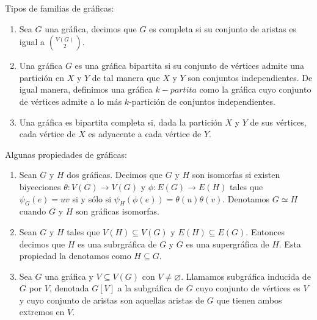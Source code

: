 \begin{definicion} Tipos de familias de gr\'aficas:
    \label{def:familias}
    \begin{enumerate}
        \item Sea $G$ una gr\'afica, decimos que $G$ es completa si su
        conjunto de aristas es igual a $\binom{V(G)}{2}$.
        \item Una gr\'afica $G$ es una gr\'afica bipartita si su conjunto de
        v\'ertices admite una partici\'on en $X$ y $Y$ de tal manera que $X$
        y $Y$ son conjuntos independientes. De igual manera, definimos una
        gr\'afica $k-\textit{partita}$ como la gr\'afica cuyo conjunto de
        v\'ertices admite a lo m\'as $k$-partici\'on de conjuntos
        independientes.
        \item Una gr\'afica es bipartita completa si, dada la partici\'on
        $X$ y $Y$ de sus v\'ertices, cada v\'ertice de $X$ es adyacente a
        cada v\'ertice de $Y$.   
    \end{enumerate}
\end{definicion}

\begin{definicion} Algunas propiedades de gr\'aficas:
    \label{def:propiedades}
    \begin{enumerate}
        \item Sean $G$ y $H$ dos gr\'aficas. Decimos que $G$ y $H$ son
         isomorfas si existen biyecciones $\theta: V(G) \rightarrow V(G)$ y
         $\phi: E(G) \rightarrow E(H)$ tales que $\psi_G(e)=uv$ si y s\'olo
         si $\psi_H(\phi(e))= \theta(u)\theta(v)$. Denotamos $G \simeq H$
         cuando $G$ y $H$ son gr\'aficas isomorfas.
        \item Sean $G$ y $H$ tales que $V(H) \subseteq V(G)$ y $E(H)
        \subseteq E(G)$. Entonces decimos que $H$ es una subrgr\'afica de
        $G$ y $G$ es una supergr\'afica de $H$. Esta propiedad la denotamos
        como $H \subseteq G$. 
        \item Sea $G$ una gr\'afica y $V \subseteq V(G)$ con $V \neq
        \varnothing$. Llamamos subgr\'afica inducida de $G$ por $V$,
        denotada $G[V]$ a la subgr\'afica de $G$ cuyo conjunto de v\'ertices
        es $V$ y cuyo conjunto de aristas son aquellas aristas de $G$ que
        tienen ambos extremos en $V$.
    \end{enumerate}
\end{definicion}

